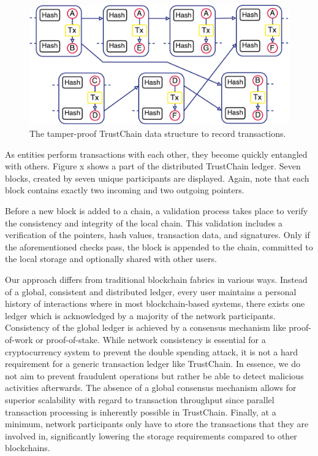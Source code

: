 \documentclass[USenglish]{article}
\begin{document}
\begin{figure}[h!]
	\centering
	\includegraphics[width=0.8\columnwidth]{assets/trustchain}
	\caption{The tamper-proof TrustChain data structure to record transactions.}
	\label{fig:trustchain}
\end{figure}

As entities perform transactions with each other, they become quickly entangled with others.
Figure x shows a part of the distributed TrustChain ledger.
Seven blocks, created by seven unique participants are displayed.
Again, note that each block contains exactly two incoming and two outgoing pointers.

Before a new block is added to a chain, a validation process takes place to verify the consistency and integrity of the local chain.
This validation includes a verification of the pointers, hash values, transaction data, and signatures.
Only if the aforementioned checks pass, the block is appended to the chain, committed to the local storage and optionally shared with other users.

Our approach differs from traditional blockchain fabrics in various ways.
Instead of a global, consistent and distributed ledger, every user maintains a personal history of interactions where in most blockchain-based systems, there exists one ledger which is acknowledged by a majority of the network participants.
Consistency of the global ledger is achieved by a consensus mechanism like proof-of-work or proof-of-stake.
While network consistency is essential for a cryptocurrency system to prevent the double spending attack, it is not a hard requirement for a generic transaction ledger like TrustChain.
In essence, we do not aim to prevent fraudulent operations but rather be able to detect malicious activities afterwards.
The absence of a global consensus mechanism allows for superior scalability with regard to transaction throughput since parallel transaction processing is inherently possible in TrustChain.
Finally, at a minimum, network participants only have to store the transactions that they are involved in, significantly lowering the storage requirements compared to other blockchains.
\end{document}
